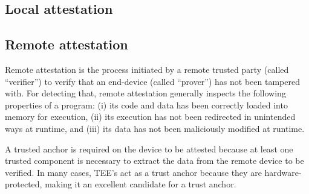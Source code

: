 \subsection{Local attestation}
\subsection{Remote attestation}

Remote attestation is the process initiated by a remote trusted party (called ``verifier'') to verify that an end-device (called ``prover'') has not been tampered with. For detecting that, remote attestation generally inspects the following properties of a program: (i) its code and data has been correctly loaded into memory for execution, (ii) its execution has not been redirected in unintended ways at runtime, and (iii) its data has not been maliciously modified at runtime.

A trusted anchor is required on the device to be attested because at least one trusted component is necessary to extract the data from the remote device to be verified. In many cases, TEE's act as a trust anchor because they are hardware-protected, making it an excellent candidate for a trust anchor.
